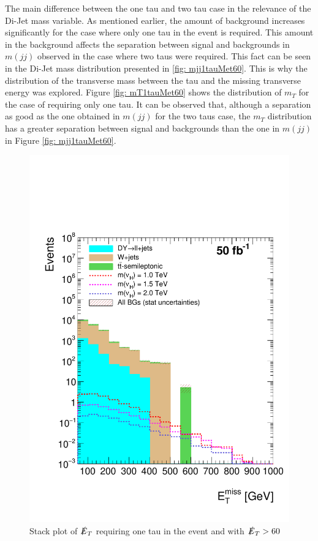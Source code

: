 The main difference between the one tau and two tau case in the relevance of the Di-Jet mass variable. As mentioned earlier, the amount of background increases significantly for the case where only one tau in the event is required. This amount in the background affects the separation between signal and backgrounds in $m(jj)$ observed in the case where two taus were required. This fact can be seen in the Di-Jet mass distribution presented in \ref{fig: mjj1tauMet60}. This is why the distribution of the transverse mass between the tau and the missing transverse energy was explored. Figure \ref{fig: mT1tauMet60} shows the distribution of $m_{T}$ for the case of requiring only one tau. It can be observed that, although a separation as good as the one obtained in $m(jj)$ for the two taus case, the $m_{T}$ distribution has a greater separation between signal and backgrounds than the one in $m(jj)$ in Figure \ref{fig: mjj1tauMet60}.


\begin{figure}[H]
\centering
\includegraphics[width=\linewidth]{StackPlots/MET_1Tau_met60_50ifb.pdf}
\caption{Stack plot of $\slashed{E}_{T}$ requiring one tau in the event and with $\slashed{E}_{T} > 60$}
\label{fig: MET1tauMet60}
\end{figure}

